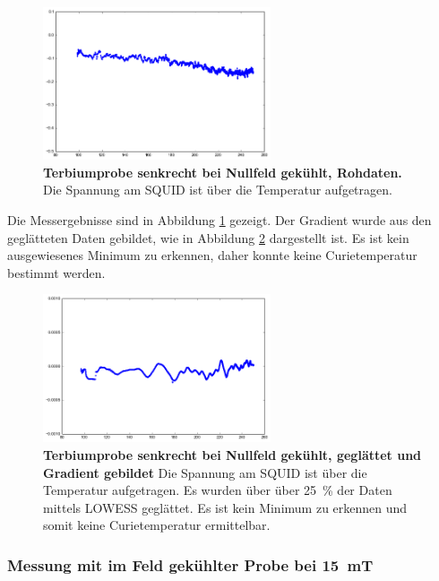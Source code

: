 \documentclass[a4paper,ngerman]{scrartcl}
\begin{document}
\begin{figure}
\centering
\includegraphics[width=0.6\textwidth]{abbildungen/Tb_sr_0_mit.png}
\caption[Terbiumprobe senkrecht bei Nullfeld]{\textbf{Terbiumprobe senkrecht bei Nullfeld gekühlt, Rohdaten.} Die Spannung am SQUID ist über die Temperatur aufgetragen.}
\label{fig:Tb_sr_0_mit}
\end{figure}

Die Messergebnisse sind in Abbildung \ref{fig:Tb_sr_0_mit} gezeigt. 
Der Gradient wurde aus den geglätteten Daten gebildet, wie in Abbildung \ref{fig:Tb_sr_0_grad_mit} dargestellt ist. 
Es ist kein ausgewiesenes Minimum zu erkennen, daher konnte keine Curietemperatur bestimmt werden.


\begin{figure}
\centering
\includegraphics[width=0.6\textwidth]{abbildungen/Tb_sr_0_grad_mit.png}
\caption[Terbiumprobe senkrecht bei Nullfeld]{\textbf{Terbiumprobe senkrecht bei Nullfeld gekühlt, geglättet und Gradient gebildet} Die Spannung am SQUID ist über die Temperatur aufgetragen. Es wurden über über 25~\% der Daten mittels LOWESS geglättet. Es ist kein Minimum zu erkennen und somit keine Curietemperatur ermittelbar.}
\label{fig:Tb_sr_0_grad_mit}
\end{figure}



\subsubsection*{Messung mit im Feld gekühlter Probe bei \SI{15}{mT}}
\end{document}
